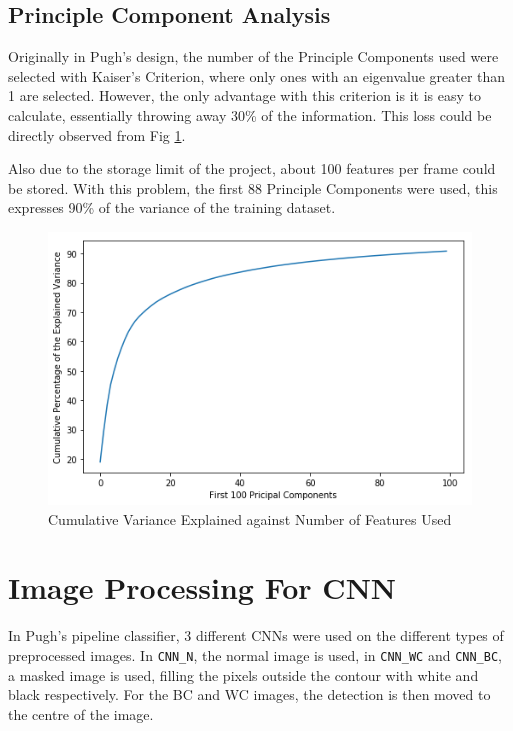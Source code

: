 \documentclass[bsc,logo,twoside,fullspacing,parskip]{infthesis}
\begin{document}
\subsection{Principle Component Analysis}

Originally in Pugh's design, the number of the Principle Components used were selected with Kaiser's Criterion, where only ones with an eigenvalue greater than 1 are selected. 
However, the only advantage with this criterion is it is easy to calculate, essentially throwing away 30\% of the information. This loss could be directly observed from Fig \ref{fig:pcsused}.

Also due to the storage limit of the project, about 100 features per frame could be stored. With this problem, the first 88 Principle Components were used, this expresses 90\% of the variance of the training dataset.

\begin{figure}[ht]
\centering
    \includegraphics[scale=0.40]{graph/pcas.png}
    \caption{Cumulative Variance Explained against Number of Features Used}
    \label{fig:pcsused}
\end{figure}

\section{Image Processing For CNN}
\label{sec:CNNprepro}

In Pugh's pipeline classifier, 3 different CNNs were used on the different types of preprocessed images.
In  {\tt CNN\_N}, the normal image is used, in {\tt CNN\_WC} and {\tt CNN\_BC}, a masked image is used, filling the pixels outside the contour with white and black respectively.
For the BC and WC images, the detection is then moved to the centre of the image.
\end{document}
